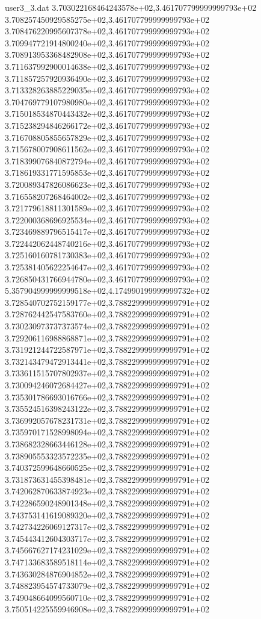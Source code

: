 \begin{filecontents}{user3_3.dat}
3.703022168464243578e+02,3.461707799999999793e+02
3.708257450929585275e+02,3.461707799999999793e+02
3.708476220995607378e+02,3.461707799999999793e+02
3.709947721914800240e+02,3.461707799999999793e+02
3.708913953368482908e+02,3.461707799999999793e+02
3.711637992900014638e+02,3.461707799999999793e+02
3.711857257920936490e+02,3.461707799999999793e+02
3.713328263885229035e+02,3.461707799999999793e+02
3.704769779107980980e+02,3.461707799999999793e+02
3.715018534870443432e+02,3.461707799999999793e+02
3.715238294846266172e+02,3.461707799999999793e+02
3.716708805855657829e+02,3.461707799999999793e+02
3.715678007908611562e+02,3.461707799999999793e+02
3.718399076840872794e+02,3.461707799999999793e+02
3.718619331771595853e+02,3.461707799999999793e+02
3.720089347826086623e+02,3.461707799999999793e+02
3.716558207268464002e+02,3.461707799999999793e+02
3.721779618811301589e+02,3.461707799999999793e+02
3.722000368696925534e+02,3.461707799999999793e+02
3.723469889796515417e+02,3.461707799999999793e+02
3.722442062448740216e+02,3.461707799999999793e+02
3.725160160781730383e+02,3.461707799999999793e+02
3.725381405622254647e+02,3.461707799999999793e+02
3.726850431766944780e+02,3.461707799999999793e+02
5.357904999999999518e+02,4.174990199999999732e+02
3.728540702752159177e+02,3.788229999999999791e+02
3.728762442547583760e+02,3.788229999999999791e+02
3.730230973737373574e+02,3.788229999999999791e+02
3.729206116988868871e+02,3.788229999999999791e+02
3.731921244722587971e+02,3.788229999999999791e+02
3.732143479472913441e+02,3.788229999999999791e+02
3.733611515707802937e+02,3.788229999999999791e+02
3.730094246072684427e+02,3.788229999999999791e+02
3.735301786693016766e+02,3.788229999999999791e+02
3.735524516398243122e+02,3.788229999999999791e+02
3.736992057678231731e+02,3.788229999999999791e+02
3.735970171528998094e+02,3.788229999999999791e+02
3.738682328663446128e+02,3.788229999999999791e+02
3.738905553323572235e+02,3.788229999999999791e+02
3.740372599648660525e+02,3.788229999999999791e+02
3.731873631455398481e+02,3.788229999999999791e+02
3.742062870633874923e+02,3.788229999999999791e+02
3.742286590248901348e+02,3.788229999999999791e+02
3.743753141619089320e+02,3.788229999999999791e+02
3.742734226069127317e+02,3.788229999999999791e+02
3.745443412604303717e+02,3.788229999999999791e+02
3.745667627174231029e+02,3.788229999999999791e+02
3.747133683589518114e+02,3.788229999999999791e+02
3.743630284876904852e+02,3.788229999999999791e+02
3.748823954574733079e+02,3.788229999999999791e+02
3.749048664099560710e+02,3.788229999999999791e+02
3.750514225559946908e+02,3.788229999999999791e+02

\end{filecontents}

